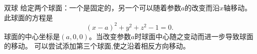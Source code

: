 ﻿\begin{surferPage}{双球}
给定两个球面：一个是固定的，另一个可以随着参数$a$的改变而沿$x$轴移动。
此球面的方程是
\[(x-a)^2+y^2+z^2-1=0.\]
球面的中心坐标是$(a,0,0)$。当改变参数$a$时球面中心随之变动而进一步导致球面的移动。
可以尝试添加第三个球面,使之沿着相反方向移动。
\end{surferPage}
